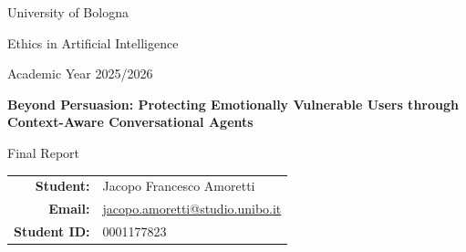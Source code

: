 \documentclass[11pt,a4paper]{article}
\newcommand{\projecttitle}{Beyond Persuasion: Protecting Emotionally Vulnerable Users through Context-Aware Conversational Agents}
\begin{document}
\begin{titlepage}
\centering
\vspace*{2cm}

{\Large University of Bologna\par}
\vspace{0.3cm}
{\large Ethics in Artificial Intelligence\par}
\vspace{0.3cm}
{\large Academic Year 2025/2026\par}

\vspace{2.2cm}
{\Huge\bfseries \projecttitle \par}

\vspace{1.3cm}
{\Large Final Report\par}

\vfill

\begin{tabular}{rl}
\textbf{Student:} & Jacopo Francesco Amoretti \\
\textbf{Email:} & \href{mailto:jacopo.amoretti@studio.unibo.it}{jacopo.amoretti@studio.unibo.it} \\
\textbf{Student ID:} & 0001177823 \\
\end{tabular}

\vspace{1.8cm}
\end{titlepage}

\begin{abstract}
This report presents \emph{Beyond Persuasion}, a local NLP pipeline designed to reduce
manipulative or overly directive LLM behavior when a message contains vulnerability-relevant
affective signals.
The system combines three main layers: transformer-based affective analysis, an explicit
rule-based ethical engine, and a local GGUF LLM prompted through standard, commercial, or
protected profiles. The ethical layer activates protection through dominant-emotion and
combined-emotion rules over sadness, anger, fear, and stress. In the final benchmark, the
pipeline used a transformer emotion model and a local Llama 3.1 GGUF backend; it protected
13 of 14 vulnerable prompts and showed a clear behavioral difference between a persuasive
commercial baseline and the guarded response mode. The project is framed through Kantian
deontology, selected Trustworthy AI requirements, and the EU AI Act's concern with
manipulation and vulnerability.
\end{abstract}
\end{document}
